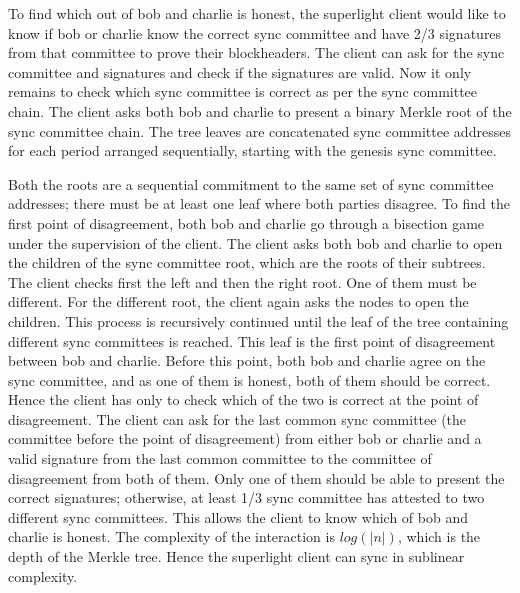 \documentclass[a4paper,11pt,oneside]{article}
\theoremstyle{definition}
\begin{document}
  To find which out of bob and charlie is honest, the superlight client would like to know if bob or charlie know the correct sync committee and have 2/3 signatures from that committee to prove their blockheaders. The client can ask for the sync committee and signatures and check if the signatures are valid. Now it only remains to check which sync committee is correct as per the sync committee chain. The client asks both bob and charlie to present a binary Merkle root of the sync committee chain. The tree leaves are concatenated sync committee addresses for each period arranged sequentially, starting with the genesis sync committee.
  
  Both the roots are a sequential commitment to the same set of sync committee addresses; there must be at least one leaf where both parties disagree. To find the first point of disagreement, both bob and charlie go through a bisection game under the supervision of the client. The client asks both bob and charlie to open the children of the sync committee root, which are the roots of their subtrees. The client checks first the left and then the right root. One of them must be different. For the different root, the client again asks the nodes to open the children. This process is recursively continued until the leaf of the tree containing different sync committees is reached. This leaf is the first point of disagreement between bob and charlie. Before this point, both bob and charlie agree on the sync committee, and as one of them is honest, both of them should be correct. Hence the client has only to check which of the two is correct at the point of disagreement. The client can ask for the last common sync committee (the committee before the point of disagreement) from either bob or charlie and a valid signature from the last common committee to the committee of disagreement from both of them. Only one of them should be able to present the correct signatures; otherwise, at least 1/3 sync committee has attested to two different sync committees. This allows the client to know which of bob and charlie is honest. The complexity of the interaction is $log(|n|)$, which is the depth of the Merkle tree. Hence the superlight client can sync in sublinear complexity.
  
\end{document}
